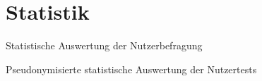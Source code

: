 \chapter{Statistik}
Statistische Auswertung der Nutzerbefragung

Pseudonymisierte statistische Auswertung der Nutzertests
